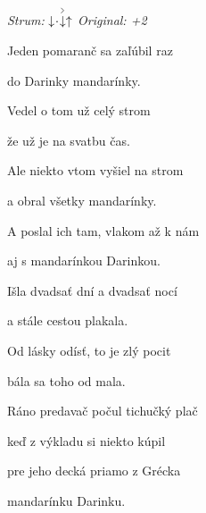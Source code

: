 \begin{song}


 \quad
\textit{Strum:} $\Down\Miss\AccentDown\Up$  \quad
\textit{Original: +2}

\large

\begin{chordbox}
\par
{}\par
{}\par
{}\par
{}\par
{}\par
\end{chordbox}

\large

\bigskip

\bigskip

Jeden pomaranč sa zaľúbil raz\par
{}do Darinky mandarínky.\par
{}Vedel o tom už celý strom\par
{}že už je na svatbu čas.\par

\bigskip

Ale niekto vtom vyšiel na strom\par
a obral všetky mandarínky.\par
A poslal ich tam, vlakom až k nám\par
aj s mandarínkou Darinkou.\par

\bigskip

Išla dvadsať dní a dvadsať nocí\par
a stále cestou plakala.\par
{}Od lásky odísť, to je zlý pocit\par
{}bála sa toho od mala. \par

\bigskip

Ráno predavač počul tichučký plač\par
keď z výkladu si niekto kúpil\par
pre jeho decká priamo z Grécka\par
{}mandarínku Darinku.\par


\end{song}
